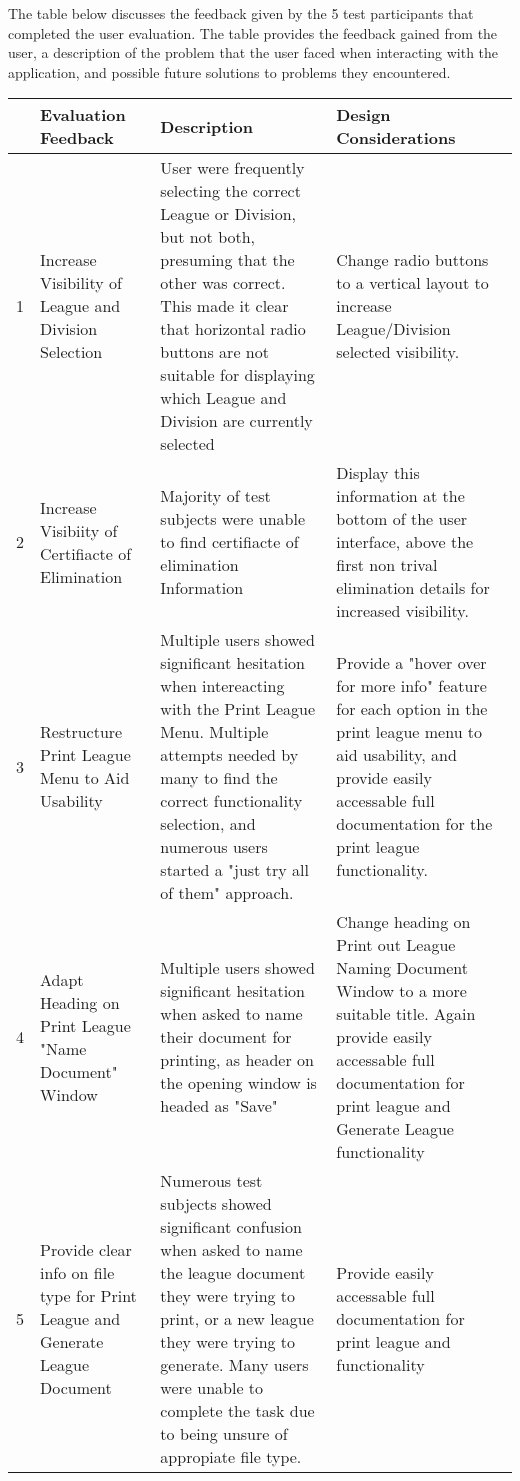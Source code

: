 The table below discusses the feedback given by the 5 test participants that completed the user evaluation. The table provides the feedback gained from the user, a description of the problem that the user faced when interacting with the application, and possible future solutions to problems they encountered. 


\begin{table}[t]

\begin{tabular}{|l|p{}|p{}|p{}|}
\hline
 & Evaluation Feedback & Description & Design Considerations  \\
\hline
1 & Increase Visibility of League and Division Selection & User were frequently selecting the correct League or Division, but not both, presuming that the other was correct. This made it clear that horizontal radio buttons are not suitable for displaying which  League and Division are currently selected   & Change radio buttons to a vertical layout to increase League/Division selected visibility.     \\
\hline
2 & Increase Visibiity of Certifiacte of Elimination & Majority of test subjects were unable to find certifiacte of elimination Information   & Display this information at the bottom of the user interface, above the first non trival elimination details for increased visibility.     \\
\hline
3 & Restructure Print League Menu to Aid Usability & Multiple users showed significant hesitation when intereacting with the Print League Menu. Multiple attempts needed by many to find the correct functionality selection, and numerous users started a "just try all of them" approach. & Provide a "hover over for more info" feature for each option in the print league menu to aid usability, and provide easily accessable full documentation for the print league functionality.   \\
\hline
4 & Adapt Heading on Print League "Name Document" Window &Multiple users showed significant hesitation when asked to name their document for printing, as header on the opening window is headed as "Save"  & Change heading on Print out League Naming Document Window to a more suitable title. Again provide easily accessable full documentation for print league and Generate League functionality    \\
\hline
5 & Provide clear info on file type for Print League and Generate League Document     & Numerous test subjects showed significant confusion when asked to name the league document they were trying to print, or a new league they were trying to generate. Many users were unable to complete the task due to being unsure of appropiate file type.  & Provide easily accessable full documentation for print league and functionality   \\

\end{tabular}
\end{table}
